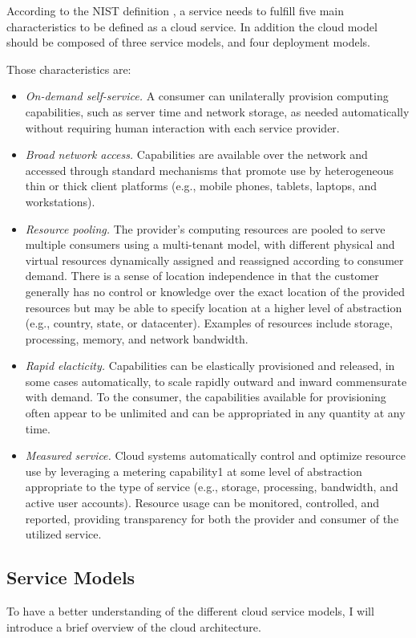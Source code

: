 		According to the NIST definition \cite{mell_nist_2011}, a service needs to fulfill five main characteristics to be defined as a cloud service. In addition the cloud model should be composed of three service models, and four deployment models.

		Those characteristics are:
		\begin{itemize}
			\item {\textit{On-demand self-service.} A consumer can unilaterally provision computing capabilities, such as server time and network storage, as needed automatically without requiring human interaction with each service provider.}
			\item {\textit{Broad network access.} Capabilities are available over the network and accessed through standard mechanisms that promote use by heterogeneous thin or thick client platforms (e.g., mobile phones, tablets, laptops, and workstations).}
			\item {\textit{Resource pooling.} The provider’s computing resources are pooled to serve multiple consumers using a multi-tenant model, with different physical and virtual resources dynamically assigned and reassigned according to consumer demand. There is a sense of location independence in that the customer generally has no control or knowledge over the exact location of the provided resources but may be able to specify location at a higher level of abstraction (e.g., country, state, or datacenter). Examples of resources include storage, processing, memory, and network bandwidth.}
			\item {\textit{Rapid elacticity.} Capabilities can be elastically provisioned and released, in some cases automatically, to scale rapidly outward and inward commensurate with demand. To the consumer, the capabilities available for provisioning often appear to be unlimited and can be appropriated in any quantity at any time.}
			\item {\textit{Measured service.} Cloud systems automatically control and optimize resource use by leveraging a metering capability1 at some level of abstraction appropriate to the type of service (e.g., storage, processing, bandwidth, and active user accounts). Resource usage can be monitored, controlled, and reported, providing transparency for both the provider and consumer of the utilized service.}
		\end{itemize}

	\subsection {Service Models}
		To have a better understanding of the different cloud service models, I will introduce a brief overview of the cloud architecture. 

